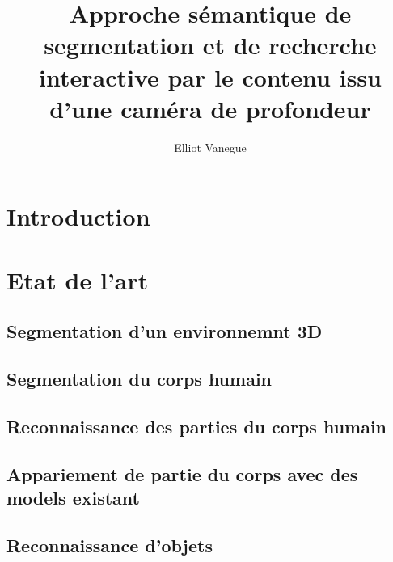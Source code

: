 \documentclass[a4paper,11pt]{article}
\title{Approche sémantique de segmentation et de recherche interactive par le contenu issu d’une caméra de profondeur}
\author{Elliot Vanegue}
\begin{document}
\maketitle
\newpage
\tableofcontents
\newpage

\begin{abstract}
\end{abstract}

\section{Introduction}


\section{Etat de l'art}

\subsection{Segmentation d'un environnemnt 3D}

\subsection{Segmentation du corps humain}

\subsection{Reconnaissance des parties du corps humain}

\subsection{Appariement de partie du corps avec des models existant}

\subsection{Reconnaissance d'objets}
\end{document}
